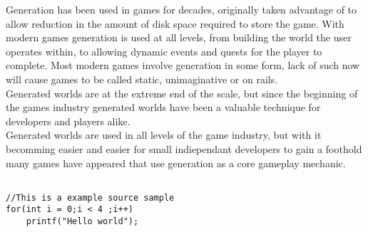 Generation has been used in games for decades, originally taken advantage
of to allow reduction in the amount of disk space required to store the game.
With modern games generation is used at all levels, from building the world the
user operates within, to allowing dynamic events and quests for the player to
complete. Most modern games involve generation in some form, lack of such now 
will cause games to be called static, unimaginative or on rails.\\

Generated worlds are at the extreme end of the scale, but since the beginning of
the games industry generated worlds have been a valuable technique for developers
and players alike.\\ 

Generated worlds are used in all levels of the game industry, but with it
becomming easier and easier for small indiependant developers to gain a foothold
many games have appeared that use generation as a core gameplay mechanic.\\

\begin{lstlisting}

//This is a example source sample
for(int i = 0;i < 4 ;i++)
	printf("Hello world");

\end{lstlisting}
